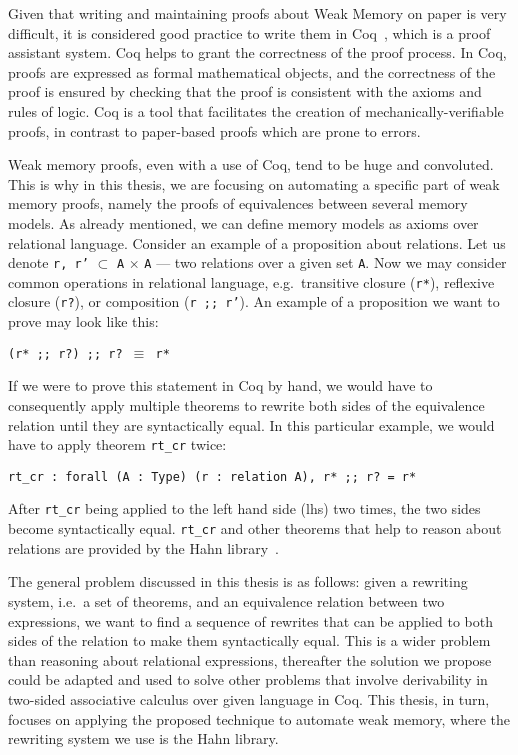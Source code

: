 Given that writing and maintaining proofs about Weak Memory on paper is very difficult, it is considered good practice to write them in Coq~\cite{bertot2013interactive}, which is a proof assistant system. Coq helps to grant the correctness of the proof process. In Coq, proofs are expressed as formal mathematical objects, and the correctness of the proof is ensured by checking that the proof is consistent with the axioms and rules of logic. Coq is a tool that facilitates the creation of mechanically-verifiable proofs, in contrast to paper-based proofs which are prone to errors.

Weak memory proofs, even with a use of Coq, tend to be huge and convoluted. This is why in this thesis, we are focusing on automating a specific part of weak memory proofs, namely the proofs of equivalences between several memory models. As already mentioned, we can define memory models as axioms over relational language. Consider an example of a proposition about relations. Let us denote \texttt{r, r'} $\subset$ \texttt{A} $\times$ \texttt{A} --- two relations over a given set \texttt{A}. Now we may consider common operations in relational language, e.g.\ transitive closure (\texttt{r*}), reflexive closure (\texttt{r?}), or composition (\texttt{r {;;} r'}). An example of a proposition we want to prove may look like this: 
\begin{center}
    \texttt{(r* {;;} r?) {;;} r? $\equiv$ r*}
\end{center}
If we were to prove this statement in Coq by hand, we would have to consequently apply multiple theorems to rewrite both sides of the equivalence relation until they are syntactically equal. In this particular example, we would have to apply theorem \texttt{rt\_cr} twice: 
\begin{center}
    \texttt{rt\_cr {:} forall (A {:} Type) (r {:} relation A), r* {;;} r? = r*}
\end{center}
After \texttt{rt\_cr} being applied to the left hand side (lhs) two times, the two sides become syntactically equal. \texttt{rt\_cr} and other theorems that help to reason about relations are provided by the Hahn library~\cite{hahn_lib}. 

The general problem discussed in this thesis is as follows: given a rewriting system, i.e.\ a set of theorems, and an equivalence relation between two expressions, we want to find a sequence of rewrites that can be applied to both sides of the relation to make them syntactically equal. This is a wider problem than reasoning about relational expressions, thereafter the solution we propose could be adapted and used to solve other problems that involve derivability in two-sided associative calculus over given language in Coq. This thesis, in turn, focuses on applying the proposed technique to automate weak memory, where the rewriting system we use is the Hahn library. 

